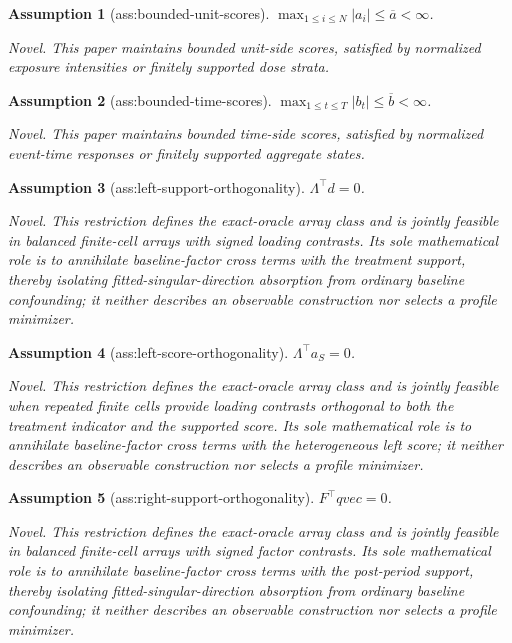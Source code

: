 \documentclass{article}
\newtheorem{assumption}{Assumption}
\begin{document}
\begin{assumption}[ass:bounded-unit-scores]\label{ass:bounded-unit-scores}
\(\max_{1\le i\le N}|a_i|\le\overline a<\infty\).
\par\smallskip\noindent\emph{Novel.} This paper maintains bounded unit-side scores, satisfied by normalized exposure intensities or finitely supported dose strata.
\end{assumption}

\begin{assumption}[ass:bounded-time-scores]\label{ass:bounded-time-scores}
\(\max_{1\le t\le T}|b_t|\le\overline b<\infty\).
\par\smallskip\noindent\emph{Novel.} This paper maintains bounded time-side scores, satisfied by normalized event-time responses or finitely supported aggregate states.
\end{assumption}

\begin{assumption}[ass:left-support-orthogonality]\label{ass:left-support-orthogonality}
\(\Lambda^{\top}d=0\).
\par\smallskip\noindent\emph{Novel.} This restriction defines the exact-oracle array class and is jointly feasible in balanced finite-cell arrays with signed loading contrasts. Its sole mathematical role is to annihilate baseline-factor cross terms with the treatment support, thereby isolating fitted-singular-direction absorption from ordinary baseline confounding; it neither describes an observable construction nor selects a profile minimizer.
\end{assumption}

\begin{assumption}[ass:left-score-orthogonality]\label{ass:left-score-orthogonality}
\(\Lambda^{\top}a_S=0\).
\par\smallskip\noindent\emph{Novel.} This restriction defines the exact-oracle array class and is jointly feasible when repeated finite cells provide loading contrasts orthogonal to both the treatment indicator and the supported score. Its sole mathematical role is to annihilate baseline-factor cross terms with the heterogeneous left score; it neither describes an observable construction nor selects a profile minimizer.
\end{assumption}

\begin{assumption}[ass:right-support-orthogonality]\label{ass:right-support-orthogonality}
\(F^{\top}qvec=0\).
\par\smallskip\noindent\emph{Novel.} This restriction defines the exact-oracle array class and is jointly feasible in balanced finite-cell arrays with signed factor contrasts. Its sole mathematical role is to annihilate baseline-factor cross terms with the post-period support, thereby isolating fitted-singular-direction absorption from ordinary baseline confounding; it neither describes an observable construction nor selects a profile minimizer.
\end{assumption}
\end{document}
